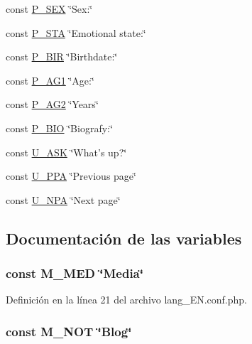 \begin{DoxyCompactItemize}
\item 
const \hyperlink{lang__EN_8conf_8php_a695823c4efbb40f67bf068989d78c024}{P\-\_\-\-S\-E\-X} \char`\"{}Sex\-:\char`\"{}
\item 
const \hyperlink{lang__EN_8conf_8php_a77097762c49f00afdf8fe7fd23b3498c}{P\-\_\-\-S\-T\-A} \char`\"{}Emotional state\-:\char`\"{}
\item 
const \hyperlink{lang__EN_8conf_8php_aef69547e66d1ba07f314ea1c00149ecb}{P\-\_\-\-B\-I\-R} \char`\"{}Birthdate\-:\char`\"{}
\item 
const \hyperlink{lang__EN_8conf_8php_af6b35f13bb73067e81a911449cb0b89b}{P\-\_\-\-A\-G1} \char`\"{}Age\-:\char`\"{}
\item 
const \hyperlink{lang__EN_8conf_8php_ae0a798c192c8f5a02ae9e12a5ff20c68}{P\-\_\-\-A\-G2} \char`\"{}Years\char`\"{}
\item 
const \hyperlink{lang__EN_8conf_8php_a333498935f4e2cb6c3904bd31379e25e}{P\-\_\-\-B\-I\-O} \char`\"{}Biografy\-:\char`\"{}
\item 
const \hyperlink{lang__EN_8conf_8php_aade6029224a1af2dbad53ec0d454186f}{U\-\_\-\-A\-S\-K} \char`\"{}What's up?\char`\"{}
\item 
const \hyperlink{lang__EN_8conf_8php_a8980fc01853b6478780875fe230eb9d2}{U\-\_\-\-P\-P\-A} \char`\"{}Previous page\char`\"{}
\item 
const \hyperlink{lang__EN_8conf_8php_a1a03538e3e8586eb7532f569d9c62a75}{U\-\_\-\-N\-P\-A} \char`\"{}Next page\char`\"{}
\end{DoxyCompactItemize}


\subsection{Documentación de las variables}
\hypertarget{lang__EN_8conf_8php_a8f62983a225a0e2c9e4c149d53adef1d}{
\subsubsection[{M\-\_\-\-M\-E\-D}]{\setlength{\rightskip}{0pt plus 5cm}const M\-\_\-\-M\-E\-D \char`\"{}Media\char`\"{}}}\label{lang__EN_8conf_8php_a8f62983a225a0e2c9e4c149d53adef1d}


Definición en la línea 21 del archivo lang\-\_\-\-E\-N.\-conf.\-php.

\hypertarget{lang__EN_8conf_8php_a54125c8fde2d02736eb378419d0c5e07}{
\subsubsection[{M\-\_\-\-N\-O\-T}]{\setlength{\rightskip}{0pt plus 5cm}const M\-\_\-\-N\-O\-T \char`\"{}Blog\char`\"{}}}\label{lang__EN_8conf_8php_a54125c8fde2d02736eb378419d0c5e07}


